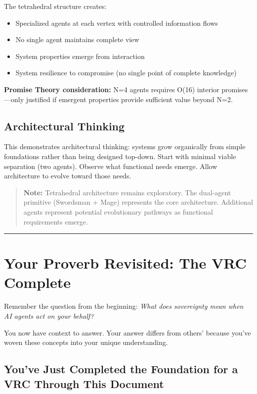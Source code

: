 \documentclass[
]{article}
\begin{document}
The tetrahedral structure creates:

\begin{itemize}
\item
  Specialized agents at each vertex with controlled information flows
\item
  No single agent maintains complete view
\item
  System properties emerge from interaction
\item
  System resilience to compromise (no single point of complete
  knowledge)
\end{itemize}

\textbf{Promise Theory consideration:} N=4 agents requires O(16)
interior promises---only justified if emergent properties provide
sufficient value beyond N=2.

\subsection{Architectural Thinking}\label{architectural-thinking}

This demonstrates architectural thinking: systems grow organically from
simple foundations rather than being designed top-down. Start with
minimal viable separation (two agents). Observe what functional needs
emerge. Allow architecture to evolve toward those needs.

\begin{quote}
\textbf{Note:} Tetrahedral architecture remains exploratory. The
dual-agent primitive (Swordsman + Mage) represents the core
architecture. Additional agents represent potential evolutionary
pathways as functional requirements emerge.
\end{quote}

\begin{center}\rule{0.5\linewidth}{0.5pt}\end{center}

\section{Your Proverb Revisited: The VRC
Complete}\label{your-proverb-revisited-the-vrc-complete}

Remember the question from the beginning: \emph{What does sovereignty
mean when AI agents act on your behalf?}

You now have context to answer. Your answer differs from others' because
you've woven these concepts into your unique understanding.

\subsection{You've Just Completed the Foundation for a VRC Through This
Document}\label{youve-just-completed-the-foundation-for-a-vrc-through-this-document}
\end{document}
